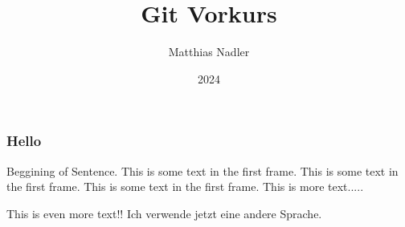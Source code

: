 \documentclass{beamer}
\title{Git Vorkurs}
\author{Matthias Nadler}
\institute{Uni Basel}
\date{2024}
\begin{document}
\frame{\titlepage}

\begin{frame}
\frametitle{Hello}
Beggining of Sentence. This is some text in the first frame. This is some text in the first frame. This is some text in the first frame.
This is more text.....

This is even more text!!
Ich verwende jetzt eine andere Sprache.

\end{frame}
\end{document}
